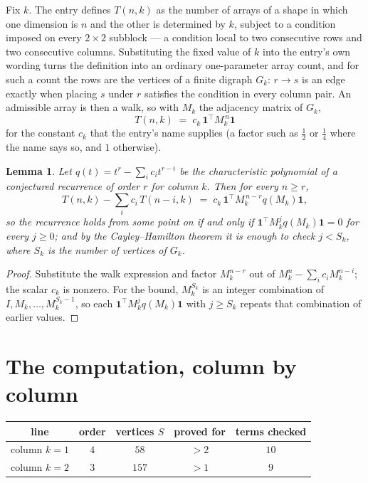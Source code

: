 \documentclass[11pt,a4paper]{article}
\theoremstyle{plain}
\newtheorem{lemma}[theorem]{Lemma}
\theoremstyle{definition}
\begin{document}
Fix $k$. The entry defines $T(n,k)$ as the number of arrays of a shape in which one dimension
is $n$ and the other is determined by $k$, subject to a condition imposed on every
$2\times2$ subblock --- a condition local to two consecutive rows and two consecutive columns.
Substituting the fixed value of $k$ into the entry's own wording turns the definition into an
ordinary one-parameter array count, and for such a count the rows are the vertices of a finite
digraph $G_k$: $r\to s$ is an edge exactly when placing $s$ under $r$ satisfies the condition
in every column pair. An admissible array is then a walk, so with $M_k$ the adjacency matrix
of $G_k$,
\[
T(n,k)\;=\;c_k\,\mathbf{1}^{\!\top}M_k^{\,n}\mathbf{1}
\]
for the constant $c_k$ that the entry's name supplies (a factor such as $\tfrac12$ or
$\tfrac14$ where the name says so, and $1$ otherwise).

\begin{lemma}\label{lem:crit}
Let $q(t)=t^{r}-\sum_i c_it^{r-i}$ be the characteristic polynomial of a conjectured
recurrence of order $r$ for column $k$. Then for every $n\ge r$,
\[
T(n,k)-\sum_i c_i\,T(n-i,k)\;=\;c_k\,\mathbf{1}^{\!\top}M_k^{\,n-r}q(M_k)\mathbf{1},
\]
so the recurrence holds from some point on if and only if
$\mathbf{1}^{\!\top}M_k^{j}q(M_k)\mathbf{1}=0$ for every $j\ge0$; and by the
Cayley--Hamilton theorem it is enough to check $j<S_k$, where $S_k$ is the number of vertices
of $G_k$.
\end{lemma}

\begin{proof}
Substitute the walk expression and factor $M_k^{n-r}$ out of $M_k^{n}-\sum_ic_iM_k^{n-i}$;
the scalar $c_k$ is nonzero. For the bound, $M_k^{S_k}$ is an integer combination of
$I,M_k,\dots,M_k^{S_k-1}$, so each $\mathbf{1}^{\!\top}M_k^{j}q(M_k)\mathbf{1}$ with
$j\ge S_k$ repeats that combination of earlier values.
\end{proof}

\section{The computation, column by column}

\begin{center}
\begin{tabular}{ccccc}
line & order & vertices $S$ & proved for & terms checked \\ \hline
column $k$$=1$ & $4$ & $58$ & $>2$ & $10$ \\
column $k$$=2$ & $3$ & $157$ & $>1$ & $9$ \\
\end{tabular}
\end{center}
\end{document}
